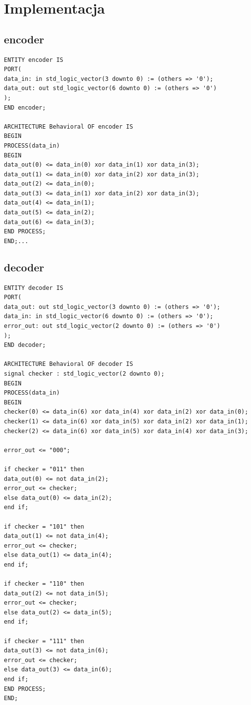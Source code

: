 \documentclass[a4paper,11pt]{article}
\begin{document}
		\section{Implementacja}
			\subsection{encoder}
				\begin{verbatim}
ENTITY encoder IS
PORT(
data_in: in std_logic_vector(3 downto 0) := (others => '0');
data_out: out std_logic_vector(6 downto 0) := (others => '0')
);
END encoder;

ARCHITECTURE Behavioral OF encoder IS
BEGIN
PROCESS(data_in)
BEGIN
data_out(0) <= data_in(0) xor data_in(1) xor data_in(3);
data_out(1) <= data_in(0) xor data_in(2) xor data_in(3);
data_out(2) <= data_in(0);
data_out(3) <= data_in(1) xor data_in(2) xor data_in(3);
data_out(4) <= data_in(1);
data_out(5) <= data_in(2);
data_out(6) <= data_in(3);
END PROCESS;
END;...
				\end{verbatim}
				
			\subsection{decoder}
				\begin{verbatim}
ENTITY decoder IS
PORT(
data_out: out std_logic_vector(3 downto 0) := (others => '0');
data_in: in std_logic_vector(6 downto 0) := (others => '0');
error_out: out std_logic_vector(2 downto 0) := (others => '0')
);
END decoder;

ARCHITECTURE Behavioral OF decoder IS
signal checker : std_logic_vector(2 downto 0);
BEGIN
PROCESS(data_in)
BEGIN
checker(0) <= data_in(6) xor data_in(4) xor data_in(2) xor data_in(0);
checker(1) <= data_in(6) xor data_in(5) xor data_in(2) xor data_in(1);
checker(2) <= data_in(6) xor data_in(5) xor data_in(4) xor data_in(3);

error_out <= "000";

if checker = "011" then 
data_out(0) <= not data_in(2);
error_out <= checker;
else data_out(0) <= data_in(2);
end if;

if checker = "101" then 
data_out(1) <= not data_in(4);
error_out <= checker;
else data_out(1) <= data_in(4);
end if;

if checker = "110" then 
data_out(2) <= not data_in(5);
error_out <= checker;
else data_out(2) <= data_in(5);
end if;

if checker = "111" then 
data_out(3) <= not data_in(6);
error_out <= checker;
else data_out(3) <= data_in(6);
end if;
END PROCESS;
END;
				\end{verbatim}
\end{document}
